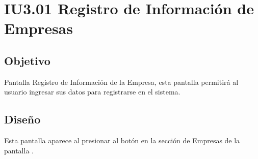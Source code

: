 \newpage
\section{IU3.01 Registro de Información de Empresas}

\subsection{Objetivo}
	Pantalla Registro de Información de la Empresa, esta pantalla permitirá al usuario ingresar sus datos para registrarse en el sistema.
	


\subsection{Diseño}
	Esta pantalla aparece al presionar al botón  en la sección de Empresas de la pantalla .

	
